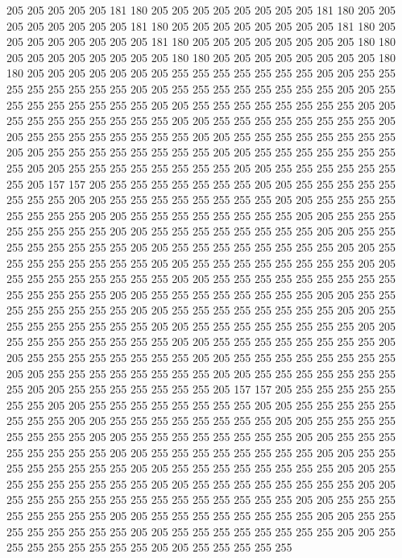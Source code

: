 205 205 205 205 205 181 180 205 205 205 205 205 205 205 205 181 180 205 205 205
205 205 205 205 205 181 180 205 205 205 205 205 205 205 205 181 180 205 205 205
205 205 205 205 205 181 180 205 205 205 205 205 205 205 205 180 180 205 205 205
205 205 205 205 205 180 180 205 205 205 205 205 205 205 205 180 180 205 205 205
205 205 205 205 255 255 255 255 255 255 255 205 205 255 255 255 255 255 255 255
255 205 205 255 255 255 255 255 255 255 255 205 205 255 255 255 255 255 255 255
255 205 205 255 255 255 255 255 255 255 255 205 205 255 255 255 255 255 255 255
255 205 205 255 255 255 255 255 255 255 255 205 205 255 255 255 255 255 255 255
255 205 205 255 255 255 255 255 255 255 255 205 205 255 255 255 255 255 255 255
255 205 205 255 255 255 255 255 255 255 255 205 205 255 255 255 255 255 255 255
255 205 205 255 255 255 255 255 255 255 205 157 157 205 255 255 255 255 255 255
255 205 205 255 255 255 255 255 255 255 255 205 205 255 255 255 255 255 255 255
255 205 205 255 255 255 255 255 255 255 255 205 205 255 255 255 255 255 255 255
255 205 205 255 255 255 255 255 255 255 255 205 205 255 255 255 255 255 255 255
255 205 205 255 255 255 255 255 255 255 255 205 205 255 255 255 255 255 255 255
255 205 205 255 255 255 255 255 255 255 255 205 205 255 255 255 255 255 255 255
255 205 205 255 255 255 255 255 255 255 255 205 205 255 255 255 255 255 255 255
255 255 255 255 255 255 255 205 205 255 255 255 255 255 255 255 255 205 205 255
255 255 255 255 255 255 255 205 205 255 255 255 255 255 255 255 255 205 205 255
255 255 255 255 255 255 255 205 205 255 255 255 255 255 255 255 255 205 205 255
255 255 255 255 255 255 255 205 205 255 255 255 255 255 255 255 255 205 205 255
255 255 255 255 255 255 255 205 205 255 255 255 255 255 255 255 255 205 205 255
255 255 255 255 255 255 255 205 205 255 255 255 255 255 255 255 255 205 205 255
255 255 255 255 255 255 205 157 157 205 255 255 255 255 255 255 255 205 205 255
255 255 255 255 255 255 255 205 205 255 255 255 255 255 255 255 255 205 205 255
255 255 255 255 255 255 255 205 205 255 255 255 255 255 255 255 255 205 205 255
255 255 255 255 255 255 255 205 205 255 255 255 255 255 255 255 255 205 205 255
255 255 255 255 255 255 255 205 205 255 255 255 255 255 255 255 255 205 205 255
255 255 255 255 255 255 255 205 205 255 255 255 255 255 255 255 255 205 205 255
255 255 255 255 255 255 255 205 205 255 255 255 255 255 255 255 255 255 255 255
255 255 255 205 205 255 255 255 255 255 255 255 255 205 205 255 255 255 255 255
255 255 255 205 205 255 255 255 255 255 255 255 255 205 205 255 255 255 255 255
255 255 255 205 205 255 255 255 255 255 255 255 255 205 205 255 255 255 255 255

